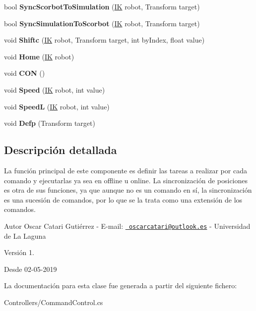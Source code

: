 \begin{DoxyCompactItemize}
\mbox{\label{class_command_control_a69ae96214c4e9cd5f8d3ded57cfe9ba3}} 
bool {\bfseries Sync\+Scorbot\+To\+Simulation} (\mbox{\hyperlink{class_i_k}{IK}} robot, Transform target)
\item 
\mbox{\label{class_command_control_aaa99e27c42b07a387f90af03540ba601}} 
bool {\bfseries Sync\+Simulation\+To\+Scorbot} (\mbox{\hyperlink{class_i_k}{IK}} robot, Transform target)
\item 
\mbox{\label{class_command_control_a2de00fee85f608fefc888d987f889af4}} 
void {\bfseries Shiftc} (\mbox{\hyperlink{class_i_k}{IK}} robot, Transform target, int by\+Index, float value)
\item 
\mbox{\label{class_command_control_adae6d4a043a93ded9d51679d78e24ce4}} 
void {\bfseries Home} (\mbox{\hyperlink{class_i_k}{IK}} robot)
\item 
\mbox{\label{class_command_control_a951dd9ecf782547f973c12db75c6f29a}} 
void {\bfseries C\+ON} ()
\item 
\mbox{\label{class_command_control_a7f9634a3a5d21f875edd276f2b06cadb}} 
void {\bfseries Speed} (\mbox{\hyperlink{class_i_k}{IK}} robot, int value)
\item 
\mbox{\label{class_command_control_a05bef86b53aac0d93fea4c255dbe5f86}} 
void {\bfseries SpeedL} (\mbox{\hyperlink{class_i_k}{IK}} robot, int value)
\item 
\mbox{\label{class_command_control_ada99694b0c348a0256faebab0899333b}} 
void {\bfseries Defp} (Transform target)
\end{DoxyCompactItemize}


\subsection{Descripción detallada}
La función principal de este componente es definir las tareas a realizar por cada comando y ejecutarlas ya sea en offline u online. La sincronización de posiciones es otra de sus funciones, ya que aunque no es un comando en sí, la sincronización es una sucesión de comandos, por lo que se la trata como una extensión de los comandos. \begin{DoxyAuthor}{Autor}
Oscar Catari Gutiérrez -\/ E-\/mail\+: \href{mailto:oscarcatari@outlook.es}{\texttt{ oscarcatari@outlook.\+es}} -\/ Universidad de La Laguna 
\end{DoxyAuthor}
\begin{DoxyVersion}{Versión}
1. 
\end{DoxyVersion}
\begin{DoxySince}{Desde}
02-\/05-\/2019 
\end{DoxySince}


La documentación para esta clase fue generada a partir del siguiente fichero\+:\begin{DoxyCompactItemize}
\item 
Controllers/Command\+Control.\+cs\end{DoxyCompactItemize}

